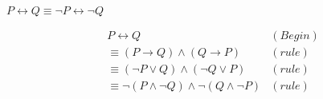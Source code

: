 
$P \leftrightarrow Q \equiv \neg P \leftrightarrow \neg Q$

\begin{align*}
  &P \leftrightarrow Q &(Begin)\\
  &\equiv (P \rightarrow Q) \land (Q \rightarrow P) &(rule)\\
  &\equiv (\neg P \lor Q) \land (\neg Q \lor P) &(rule)\\
  &\equiv \neg(P \land \neg Q) \land \neg(Q \land \neg P) &(rule)
\end{align*}
